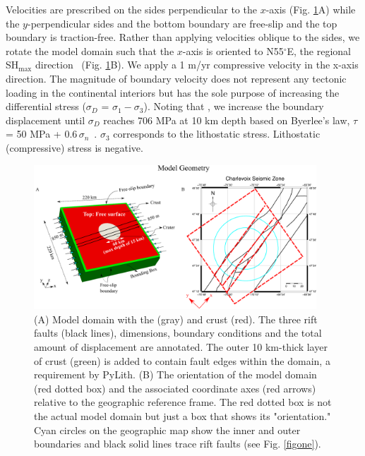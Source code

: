 \documentclass[draft]{agujournal2018}
\begin{document}
Velocities are prescribed on the sides perpendicular to the $x$-axis (Fig. \ref{figtwo}A) while the $y$-perpendicular sides and the bottom boundary are free-slip and the top boundary is traction-free. Rather than applying velocities oblique to the sides, we rotate the model domain such that the $x$-axis is oriented to N55$^\circ$E, the regional SH$_{\max}$ direction~\citep{Zoback_1992} (Fig. \ref{figtwo}B). We apply a 1 m/yr compressive velocity in the x-axis direction. The magnitude of boundary velocity does not represent any tectonic loading in the continental interiors but has the sole purpose of increasing the differential stress ($\sigma_D$ = $\sigma_1 - \sigma_3$). Noting that  \citep{Baird_2010,Powell_2017}, we increase the boundary displacement until $\sigma_D$ reaches 706 MPa at 10 km depth based on Byerlee's law, $\tau$  = 50 MPa + 0.6$\,\sigma_n$~\citep{Byerlee_1978}. $\sigma_3$ corresponds to the lithostatic stress. Lithostatic (compressive) stress is negative. 

\begin{figure}[ht]
\centering
\includegraphics[width=25pc]{Figures/model_geometry.png}
\caption{(A) Model domain with the  (gray) and crust (red). The three rift faults (black lines), dimensions, boundary conditions and the total amount of displacement are annotated. The outer 10 km-thick layer of crust (green) is added to contain fault edges within the domain, a requirement by PyLith. (B) The orientation of the model domain (red dotted box) and the associated coordinate axes (red arrows) relative to the geographic reference frame. The red dotted box is not the actual model domain but just a box that shows its "orientation." Cyan circles on the geographic map show the inner and outer  boundaries and black solid lines trace rift faults (see Fig. \ref{figone}).}
\label{figtwo}
\end{figure}
\end{document}
